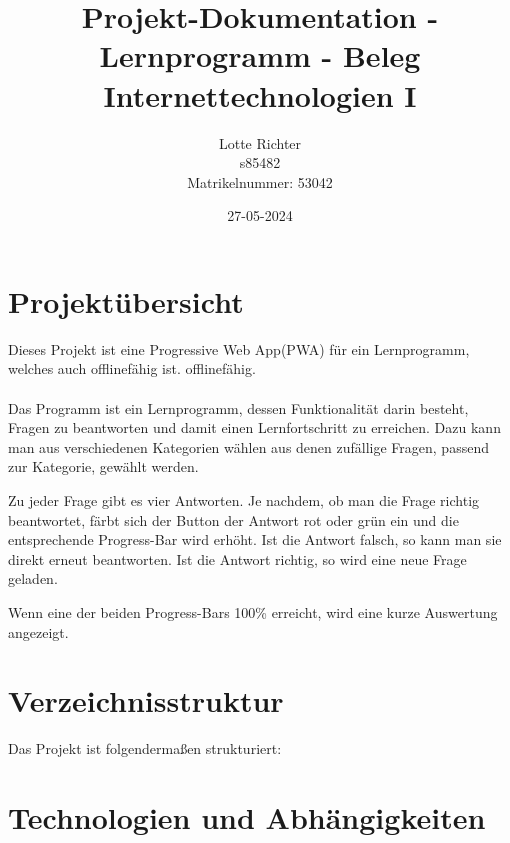 \documentclass{article}
\title{Projekt-Dokumentation - Lernprogramm - Beleg Internettechnologien I}
\date{27-05-2024}
\author{Lotte Richter\\ s85482\\Matrikelnummer: 53042}
\begin{document}
  \maketitle
  \tableofcontents
  \newpage

\section{Projektübersicht}

Dieses Projekt ist eine Progressive Web App(PWA) für ein Lernprogramm, welches auch offlinefähig ist.
offlinefähig.\\\\
Das Programm ist ein Lernprogramm, dessen Funktionalität darin besteht, Fragen zu beantworten und damit einen Lernfortschritt zu erreichen.
Dazu kann man aus verschiedenen Kategorien wählen aus denen zufällige Fragen, passend zur Kategorie, gewählt werden.

Zu jeder Frage gibt es vier Antworten. Je nachdem, ob man die Frage richtig beantwortet, färbt sich der Button der Antwort rot oder grün ein
und die entsprechende Progress-Bar wird erhöht. Ist die Antwort falsch, so kann man sie direkt erneut beantworten. Ist die Antwort richtig, so wird
eine neue Frage geladen.

Wenn eine der beiden Progress-Bars 100\% erreicht, wird eine kurze Auswertung angezeigt.

\section{Verzeichnisstruktur}
Das Projekt ist folgendermaßen strukturiert:\\


\section{Technologien und Abhängigkeiten}
\end{document}
